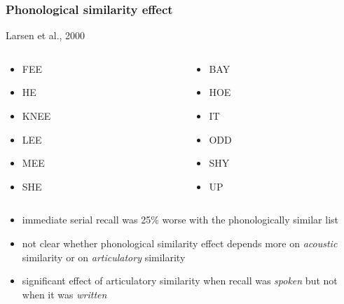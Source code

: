 \documentclass[]{beamer}
\begin{document}
\begin{frame}
 \frametitle{Phonological similarity effect}
\begin{overlayarea}{120mm}{80mm}
Larsen et al., 2000 
\begin{columns}[T]
 \begin{column}{20mm}
 \begin{itemize}
  \item[] FEE 
  \item[] HE 
  \item[] KNEE 
  \item[] LEE 
  \item[] MEE 
  \item[] SHE 
 \end{itemize}
 \end{column}

 \begin{column}{20mm}
 \begin{itemize}
  \item[] BAY 
  \item[] HOE
  \item[] IT 
  \item[] ODD 
  \item[] SHY 
  \item[] UP 
 \end{itemize} 
 \end{column}
\end{columns}

\begin{itemize}
 \item<2->[$\Rightarrow$] immediate serial recall was 25\% worse with the phonologically similar list
 \item<3-> [BUT] not clear whether phonological similarity effect depends more on \textit{acoustic} similarity or on \textit{articulatory} similarity  
 \item<4->[!] significant effect of articulatory similarity when recall was \textit{spoken} but not when it was \textit{written}
\end{itemize}
\end{overlayarea}
\end{frame}
\end{document}
